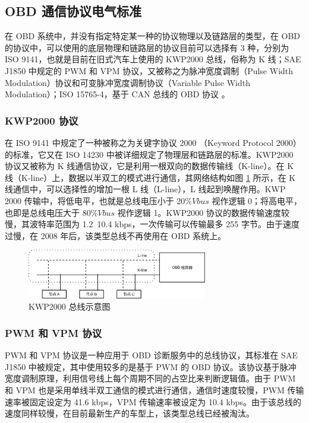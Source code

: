 \subsection{OBD 通信协议电气标准}
在 OBD 系统中，并没有指定特定某一种的协议物理以及链路层的类型，在 OBD 的协议中，可以使用的底层物理和链路层的协议目前可以选择有 3 种，分别为 ISO 9141，也就是目前在旧式汽车上使用的 KWP2000 总线，俗称为 K 线；SAE J1850 中规定的 PWM 和 VPM 协议，又被称之为脉冲宽度调制（Pulse Width Modulation）协议和可变脉冲宽度调制协议（Variable Pulse Width Modulation）；ISO 15765-4，基于 CAN 总线的 OBD 协议 \cite{Li2013Design}。

\subsubsection{KWP2000 协议}
在 ISO 9141 中规定了一种被称之为关键字协议 2000 （Keyword Protocol 2000）的标准，它又在 ISO 14230 中被详细规定了物理层和链路层的标准。KWP2000 协议又被称为 K 线通信协议，它是利用一根双向的数据传输线（K-line）。在 K 线（K-line）上，数据以半双工的模式进行通信，其网络结构如图 \ref{fig:OBD_K-line} 所示，在 K 线通信中，可以选择性的增加一根 L 线（L-line），L 线起到唤醒作用。KWP 2000 传输中，将低电平，也就是总线电压小于 $ 20\% Vbus$ 视作逻辑 0；将高电平，也即是总线电压大于 $ 80\% Vbus$ 视作逻辑 1。KWP2000 协议的数据传输速度较慢，其波特率范围为 1.2~10.4 kbps，一次传输可以传输最多 255 字节。由于速度过慢，在 2008 年后，该类型总线不再使用在 OBD 系统上。

\begin{figure}
	\centering
	\includegraphics[width=0.7\textwidth]{figures/K-line.png}
	\caption{KWP2000 总线示意图}\label{fig:OBD_K-line}
\end{figure}

\subsubsection{PWM 和 VPM 协议}
PWM 和 VPM 协议是一种应用于 OBD 诊断服务中的总线协议，其标准在 SAE J1850 中被规定，其中使用较多的是基于 PWM 的 OBD 协议。该协议基于脉冲宽度调制原理，利用信号线上每个周期不同的占空比来判断逻辑值。由于 PWM 和 VPM 也是采用单线半双工通信的模式进行通信，通信时速度较慢，PWM 传输速率被固定设定为 41.6 kbps，VPM 传输速率被设定为 10.4 kbps。由于该总线的速度同样较慢，在目前最新生产的车型上，该类型总线已经被淘汰。


